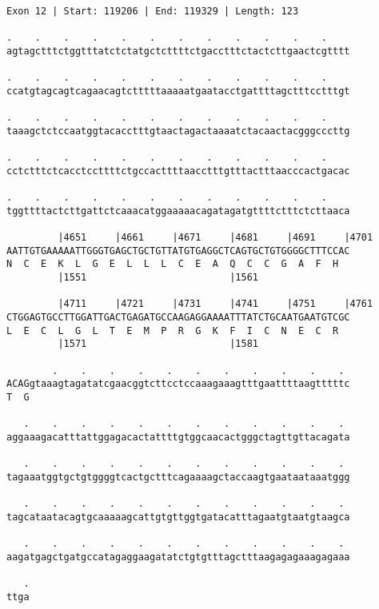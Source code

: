 \documentclass{article}
\begin{document}
\begin{Verbatim}[fontfamily=courier]
Exon 12 | Start: 119206 | End: 119329 | Length: 123

.    .    .    .    .    .    .    .    .    .    .    .    
agtagctttctggtttatctctatgctcttttctgacctttctactcttgaactcgtttt

.    .    .    .    .    .    .    .    .    .    .    .    
ccatgtagcagtcagaacagtctttttaaaaatgaatacctgattttagctttcctttgt

.    .    .    .    .    .    .    .    .    .    .    .    
taaagctctccaatggtacacctttgtaactagactaaaatctacaactacgggcccttg

.    .    .    .    .    .    .    .    .    .    .    .    
cctctttctcacctccttttctgccacttttaacctttgtttactttaacccactgacac

.    .    .    .    .    .    .    .    .    .    .    .    
tggttttactcttgattctcaaacatggaaaaacagatagatgttttctttctcttaaca

         |4651     |4661     |4671     |4681     |4691     |4701
AATTGTGAAAAATTGGGTGAGCTGCTGTTATGTGAGGCTCAGTGCTGTGGGGCTTTCCAC
N  C  E  K  L  G  E  L  L  L  C  E  A  Q  C  C  G  A  F  H  
         |1551                         |1561                

         |4711     |4721     |4731     |4741     |4751     |4761
CTGGAGTGCCTTGGATTGACTGAGATGCCAAGAGGAAAATTTATCTGCAATGAATGTCGC
L  E  C  L  G  L  T  E  M  P  R  G  K  F  I  C  N  E  C  R  
         |1571                         |1581                

        .    .    .    .    .    .    .    .    .    .    . 
ACAGgtaaagtagatatcgaacggtcttcctccaaagaaagtttgaattttaagtttttc
T  G                                                        

   .    .    .    .    .    .    .    .    .    .    .    . 
aggaaagacatttattggagacactattttgtggcaacactgggctagttgttacagata

   .    .    .    .    .    .    .    .    .    .    .    . 
tagaaatggtgctgtggggtcactgctttcagaaaagctaccaagtgaataataaatggg

   .    .    .    .    .    .    .    .    .    .    .    . 
tagcataatacagtgcaaaaagcattgtgttggtgatacatttagaatgtaatgtaagca

   .    .    .    .    .    .    .    .    .    .    .    . 
aagatgagctgatgccatagaggaagatatctgtgtttagctttaagagagaaagagaaa

   .
ttga
\end{Verbatim}
\newpage
\end{document}
